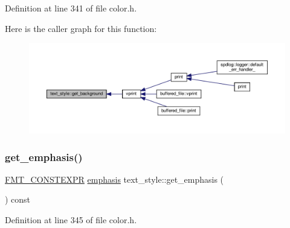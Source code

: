 Definition at line 341 of file color.\+h.

Here is the caller graph for this function\+:
\nopagebreak
\begin{figure}[H]
\begin{center}
\leavevmode
\includegraphics[width=350pt]{classtext__style_a00fb4a1cc65844bc819f71a80050181f_icgraph}
\end{center}
\end{figure}
\mbox{\label{classtext__style_aecbbaaf438871b55905c4beaea7318b5}} 
\subsubsection{\texorpdfstring{get\+\_\+emphasis()}{get\_emphasis()}}
{\footnotesize\ttfamily \hyperlink{core_8h_a69201cb276383873487bf68b4ef8b4cd}{F\+M\+T\+\_\+\+C\+O\+N\+S\+T\+E\+X\+PR} \hyperlink{color_8h_a535b59b8edc8902bb3c4f254625f91ba}{emphasis} text\+\_\+style\+::get\+\_\+emphasis (\begin{DoxyParamCaption}{ }\end{DoxyParamCaption}) const\hspace{0.3cm}{\ttfamily [inline]}}



Definition at line 345 of file color.\+h.

